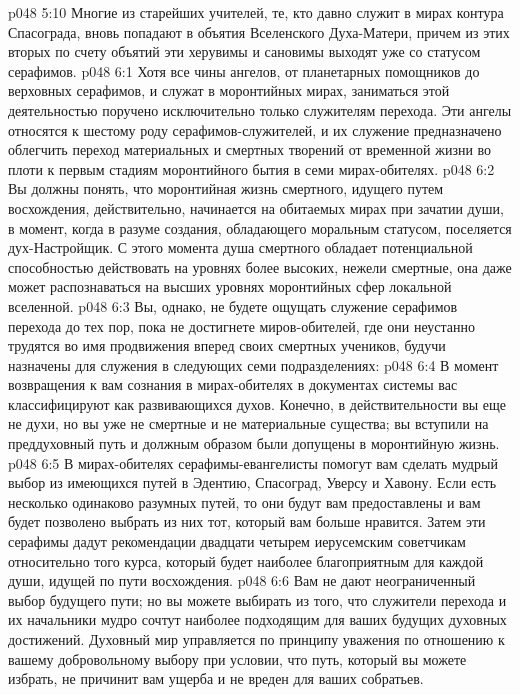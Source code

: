 \vs p048 5:10 Многие из старейших учителей, те, кто давно служит в мирах контура Спасограда, вновь попадают в объятия Вселенского Духа\hyp{}Матери, причем из этих вторых по счету объятий эти херувимы и сановимы выходят уже со статусом серафимов.
\vs p048 6:1 Хотя все чины ангелов, от планетарных помощников до верховных серафимов, и служат в моронтийных мирах, заниматься этой деятельностью поручено исключительно только служителям перехода. Эти ангелы относятся к шестому роду серафимов\hyp{}служителей, и их служение предназначено облегчить переход материальных и смертных творений от временной жизни во плоти к первым стадиям моронтийного бытия в семи мирах\hyp{}обителях.
\vs p048 6:2 Вы должны понять, что моронтийная жизнь смертного, идущего путем восхождения, действительно, начинается на обитаемых мирах при зачатии души, в момент, когда в разуме создания, обладающего моральным статусом, поселяется дух\hyp{}Настройщик. С этого момента душа смертного обладает потенциальной способностью действовать на уровнях более высоких, нежели смертные, она даже может распознаваться на высших уровнях моронтийных сфер локальной вселенной.
\vs p048 6:3 \pc Вы, однако, не будете ощущать служение серафимов перехода до тех пор, пока не достигнете миров\hyp{}обителей, где они неустанно трудятся во имя продвижения вперед своих смертных учеников, будучи назначены для служения в следующих семи подразделениях:
\vs p048 6:4 \bibnobreakspace {} В момент возвращения к вам сознания в мирах\hyp{}обителях в документах системы вас классифицируют как развивающихся духов. Конечно, в действительности вы еще не духи, но вы уже не смертные и не материальные существа; вы вступили на преддуховный путь и должным образом были допущены в моронтийную жизнь.
\vs p048 6:5 В мирах\hyp{}обителях серафимы\hyp{}евангелисты помогут вам сделать мудрый выбор из имеющихся путей в Эдентию, Спасоград, Уверсу и Хавону. Если есть несколько одинаково разумных путей, то они будут вам предоставлены и вам будет позволено выбрать из них тот, который вам больше нравится. Затем эти серафимы дадут рекомендации двадцати четырем иерусемским советчикам относительно того курса, который будет наиболее благоприятным для каждой души, идущей по пути восхождения.
\vs p048 6:6 Вам не дают неограниченный выбор будущего пути; но вы можете выбирать из того, что служители перехода и их начальники мудро сочтут наиболее подходящим для ваших будущих духовных достижений. Духовный мир управляется по принципу уважения по отношению к вашему добровольному выбору при условии, что путь, который вы можете избрать, не причинит вам ущерба и не вреден для ваших собратьев.
